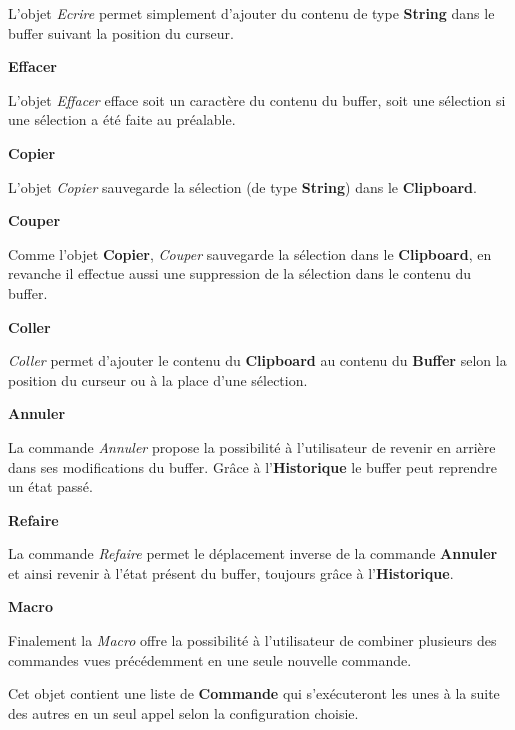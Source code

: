\documentclass[a4paper,11pt]{article}
\begin{document}
\noindent L'objet \emph{Ecrire} permet simplement d'ajouter du contenu de type \textbf{String} dans le buffer suivant la position du curseur.
\bigskip

\large{\textbf{Effacer}}
\medskip

\noindent L'objet \emph{Effacer} efface soit un caractère du contenu du buffer, soit une sélection si une sélection a été faite au préalable.
\bigskip

\large{\textbf{Copier}}
\medskip

\noindent L'objet \emph{Copier} sauvegarde la sélection (de type \textbf{String}) dans le \textbf{Clipboard}.
\bigskip

\large{\textbf{Couper}}
\medskip

\noindent Comme l'objet \textbf{Copier}, \emph{Couper} sauvegarde la sélection dans le \textbf{Clipboard}, en revanche il effectue aussi une suppression de la sélection dans le contenu du buffer.
\bigskip

\large{\textbf{Coller}}
\medskip

\noindent \emph{Coller} permet d'ajouter le contenu du \textbf{Clipboard} au contenu du \textbf{Buffer} selon la position du curseur ou à la place d'une sélection.
\bigskip

\large{\textbf{Annuler}}
\medskip

\noindent La commande \emph{Annuler} propose la possibilité à l'utilisateur de revenir en arrière dans ses modifications du buffer. Grâce à l'\textbf{Historique} le buffer peut reprendre un état passé.
\bigskip

\large{\textbf{Refaire}}
\medskip

\noindent La commande \emph{Refaire} permet le déplacement inverse de la commande \textbf{Annuler} et ainsi revenir à l'état présent du buffer, toujours grâce à l'\textbf{Historique}.
\bigskip

\large{\textbf{Macro}}
\medskip

\noindent Finalement la \emph{Macro} offre la possibilité à l'utilisateur de combiner plusieurs des commandes vues précédemment en une seule nouvelle commande.
\smallskip

\noindent Cet objet contient une liste de \textbf{Commande} qui s'exécuteront les unes à la suite des autres en un seul appel selon la configuration choisie.
\bigskip

\clearpage

%
%
\end{document}
